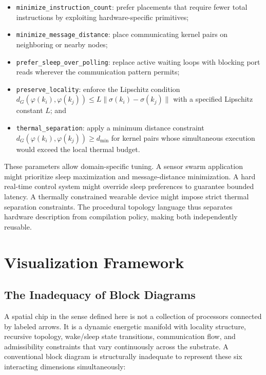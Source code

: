 \documentclass[11pt, a4paper]{article}
\begin{document}
\begin{itemize}
  \item \texttt{minimize\_instruction\_count}: prefer placements that require
        fewer total instructions by exploiting hardware-specific primitives;
  \item \texttt{minimize\_message\_distance}: place communicating kernel pairs
        on neighboring or nearby nodes;
  \item \texttt{prefer\_sleep\_over\_polling}: replace active waiting loops with
        blocking port reads wherever the communication pattern permits;
  \item \texttt{preserve\_locality}: enforce the Lipschitz condition
        $d_G(\varphi(k_i), \varphi(k_j)) \leq L \|\sigma(k_i) - \sigma(k_j)\|$
        with a specified Lipschitz constant $L$; and
  \item \texttt{thermal\_separation}: apply a minimum distance constraint
        $d_G(\varphi(k_i), \varphi(k_j)) \geq d_{\min}$ for kernel pairs
        whose simultaneous execution would exceed the local thermal budget.
\end{itemize}

These parameters allow domain-specific tuning. A sensor swarm application might
prioritize sleep maximization and message-distance minimization. A hard real-time
control system might override sleep preferences to guarantee bounded latency.
A thermally constrained wearable device might impose strict thermal separation
constraints. The procedural topology language thus separates hardware description
from compilation policy, making both independently reusable.

\section{Visualization Framework}

\subsection{The Inadequacy of Block Diagrams}

A spatial chip in the sense defined here is not a collection of processors connected
by labeled arrows. It is a dynamic energetic manifold with locality structure,
recursive topology, wake/sleep state transitions, communication flow, and
admissibility constraints that vary continuously across the substrate. A conventional
block diagram is structurally inadequate to represent these six interacting
dimensions simultaneously:
\end{document}
